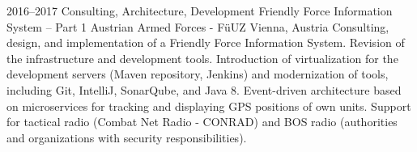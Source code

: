 \cventry
{2016--2017}
{Consulting, Architecture, Development}
{Friendly Force Information System -- Part 1}
{Austrian Armed Forces - FüUZ}
{Vienna, Austria}
{
  Consulting, design, and implementation of a Friendly Force Information System.\newline
  Revision of the infrastructure and development tools.
  Introduction of virtualization for the development servers (Maven repository, Jenkins)
  and modernization of tools, including Git, IntelliJ, SonarQube, and Java 8.\newline
  Event-driven architecture based on microservices for tracking and displaying
  GPS positions of own units. Support for tactical radio
  (Combat Net Radio - CONRAD) and BOS radio (authorities and organizations with security responsibilities).
}
